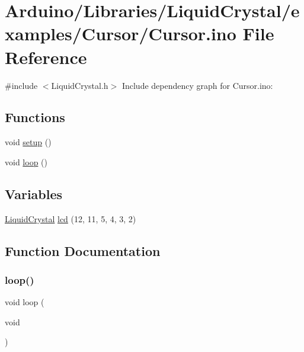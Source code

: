 \hypertarget{_cursor_8ino}{}\section{Arduino/\+Libraries/\+Liquid\+Crystal/examples/\+Cursor/\+Cursor.ino File Reference}
\label{_cursor_8ino}
{\ttfamily \#include $<$Liquid\+Crystal.\+h$>$}\newline
Include dependency graph for Cursor.\+ino\+:
\subsection*{Functions}
\begin{DoxyCompactItemize}
\item 
void \hyperlink{_cursor_8ino_a4fc01d736fe50cf5b977f755b675f11d}{setup} ()
\item 
void \hyperlink{_cursor_8ino_afe461d27b9c48d5921c00d521181f12f}{loop} ()
\end{DoxyCompactItemize}
\subsection*{Variables}
\begin{DoxyCompactItemize}
\item 
\hyperlink{class_liquid_crystal}{Liquid\+Crystal} \hyperlink{_cursor_8ino_a7226623e632d4109904c86009c9f3b60}{lcd} (12, 11, 5, 4, 3, 2)
\end{DoxyCompactItemize}


\subsection{Function Documentation}
\mbox{\label{_cursor_8ino_afe461d27b9c48d5921c00d521181f12f}} 
\subsubsection{\texorpdfstring{loop()}{loop()}}
{\footnotesize\ttfamily void loop (\begin{DoxyParamCaption}\item[{void}]{ }\end{DoxyParamCaption})}

\mbox{\label{_cursor_8ino_a4fc01d736fe50cf5b977f755b675f11d}} 
